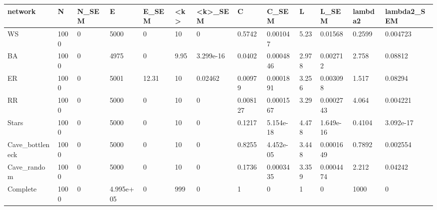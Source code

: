 \begin{tabular}{lllllllllllll}
\toprule
network & N & N_SEM & E & E_SEM & <k> & <k>_SEM & C & C_SEM & L & L_SEM & lambda2 & lambda2_SEM \\
\midrule
WS & 1000 & 0 & 5000 & 0 & 10 & 0 & 0.5742 & 0.001047 & 5.23 & 0.01568 & 0.2599 & 0.004723 \\
BA & 1000 & 0 & 4975 & 0 & 9.95 & 3.299e-16 & 0.0402 & 0.0004846 & 2.978 & 0.002712 & 2.758 & 0.08812 \\
ER & 1000 & 0 & 5001 & 12.31 & 10 & 0.02462 & 0.00979 & 0.0001891 & 3.256 & 0.003098 & 1.517 & 0.08294 \\
RR & 1000 & 0 & 5000 & 0 & 10 & 0 & 0.008127 & 0.0001567 & 3.29 & 0.0002743 & 4.064 & 0.004221 \\
Stars & 1000 & 0 & 5000 & 0 & 10 & 0 & 0.1217 & 5.154e-18 & 4.478 & 1.649e-16 & 0.4104 & 3.092e-17 \\
Cave_bottleneck & 1000 & 0 & 5000 & 0 & 10 & 0 & 0.8255 & 4.452e-05 & 3.448 & 0.0001649 & 0.7892 & 0.002554 \\
Cave_random & 1000 & 0 & 5000 & 0 & 10 & 0 & 0.1736 & 0.0003435 & 3.359 & 0.0004474 & 2.212 & 0.04242 \\
Complete & 1000 & 0 & 4.995e+05 & 0 & 999 & 0 & 1 & 0 & 1 & 0 & 1000 & 0 \\
\bottomrule
\end{tabular}
